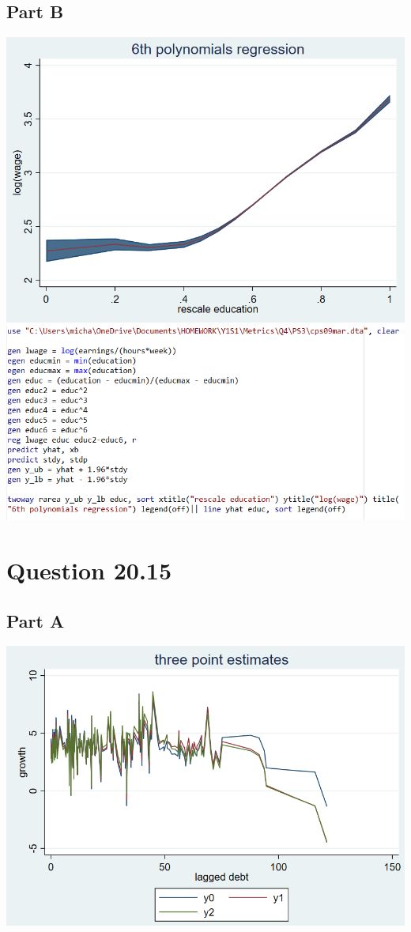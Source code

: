 \documentclass[11pt]{article} %
\begin{document}
\subsection{Part B}
\includegraphics[scale=0.7]{p2}\\
\includegraphics{p3}
\section{Question 20.15} %
\subsection{Part A}
\includegraphics[scale=0.7]{p4}
\end{document}
